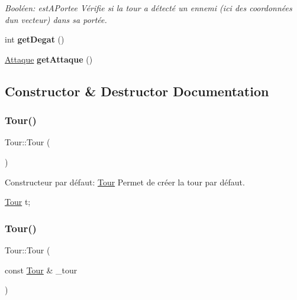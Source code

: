\begin{DoxyCompactItemize}
\begin{DoxyCompactList}\small\item\em Booléen\+: est\+A\+Portee Vérifie si la tour a détecté un ennemi (ici des coordonnées d\textquotesingle{}un vecteur) dans sa portée. \end{DoxyCompactList}\item 
\mbox{\label{classTour_a19e9adc634af6ed58dac224ade1986b8}} 
int {\bfseries get\+Degat} ()
\item 
\mbox{\label{classTour_a647b54e61e3ee195a5e830b3cd677197}} 
\hyperlink{classAttaque}{Attaque} {\bfseries get\+Attaque} ()
\end{DoxyCompactItemize}


\subsection{Constructor \& Destructor Documentation}
\mbox{\label{classTour_a85e0f0e2346d1e42a09a80c1cd6d19c4}} 
\subsubsection{\texorpdfstring{Tour()}{Tour()}\hspace{0.1cm}{\footnotesize\ttfamily [1/3]}}
{\footnotesize\ttfamily Tour\+::\+Tour (\begin{DoxyParamCaption}{ }\end{DoxyParamCaption})}



Constructeur par défaut\+: \hyperlink{classTour}{Tour} Permet de créer la tour par défaut. 


\begin{DoxyCode}
\hyperlink{classTour}{Tour} t;
\end{DoxyCode}
 \mbox{\label{classTour_a3e25a64c74446192ac71283e08db4e49}} 
\subsubsection{\texorpdfstring{Tour()}{Tour()}\hspace{0.1cm}{\footnotesize\ttfamily [2/3]}}
{\footnotesize\ttfamily Tour\+::\+Tour (\begin{DoxyParamCaption}\item[{const \hyperlink{classTour}{Tour} \&}]{\+\_\+tour }\end{DoxyParamCaption})}




